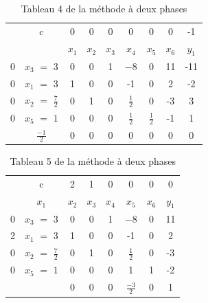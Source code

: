 \begin{table}
\centering
\begin{tabular}{|c|c|c|c|c|c|c|c|c|}
	\hline
      & c & 0 & 0 & 0 & 0 & 0 & 0 & -1 \\ 
      \cline{2-9}
       &  & $x_{1}$ & $x_{2}$  & $x_{3}$  & $x_{4}$ & $x_{5}$ & $x_{6}$ & $y_{1}$ \\
       \hline
   0 & $x_{3}$  $=$ $3$ & 0 & 0 & 1 & $-8$ & $0$ & 11 & -11 \\
      \hline
	0 & $x_{1}$ $=$ 3 & 1 & 0 & 0 & -1 & 0 & 2 & -2 \\
	  \hline
	0 & $x_{2}$ $=$ $\frac{7}{2}$  & 0 & 1 & 0 & $\frac{1}{2}$ & 0 & -3 & 3\\
	  \hline
	0 & $x_{5}$ $=$ $1$  & 0 & 0 & 0 & $\frac{1}{2}$ & $\frac{1}{2}$ & -1 & 1\\
	  \hline
	 & $\frac{-1}{2}$ & 0 & 0 & 0 & 0 & 0 & 0 & 0\\
	  \hline
	\end{tabular}
\caption{Tableau 4 de la méthode à deux phases}
\end{table}
\begin{table}
\centering

\begin{tabular}{|c|c|c|c|c|c|c|c|}
	\hline
      & c & 2 & 1 & 0 & 0 & 0 & 0  \\ 
    \cline{2-9}	
       & $x_{1}$ & $x_{2}$ & $x_{3}$  & $x_{4}$ & $x_{5}$ & $x_{6}$ & $y_{1}$ \\
       \hline
   0 & $x_{3}$  $=$ $3$ & 0 & 0 & 1 & $-8$ & $0$ & 11 \\
      \hline
	2 & $x_{1}$ $=$ 3 & 1 & 0 & 0 & -1 & 0 & 2  \\
	  \hline
	0 & $x_{2}$ $=$ $\frac{7}{2}$  & 0 & 1 & 0 & $\frac{1}{2}$ & 0 & -3 \\
	  \hline
	0 & $x_{5}$ $=$ $1$  & 0 & 0 & 0 & 1 & 1 & -2 \\
	  \hline
	 &  & 0 & 0 & 0 & $\frac{-3}{2}$ & 0 & 1 \\
	  \hline
	\end{tabular}
\caption {Tableau 5 de la méthode à deux phases}
\end{table}

